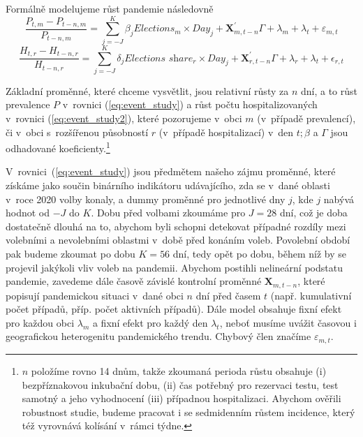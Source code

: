 Formálně modelujeme růst pandemie následovně
\begin{equation}
\label{eq:event_study}
\frac{P_{t,m} - P_{t-n,m}}{P_{t-n,m}} = \sum_{j=-J}^{K} \beta_j \textit{Elections}_m \times Day_j + \textbf{X}_{m,t-n}^{'}\Gamma + \lambda_{m} + \lambda_{t} + \varepsilon_{m,t}
\end{equation}
\begin{equation}
\label{eq:event_study2}
\frac{H_{t,r} - H_{t-n,r}}{H_{t-n,r}} = \sum_{j=-J}^{K} \delta_j \textit{Elections share}_r \times Day_j + \textbf{X}_{r,t-n}^{'}\Gamma + \lambda_{r} + \lambda_{t} + \epsilon_{r,t}
\end{equation}

Základní proměnné, které chceme vysvětlit, jsou relativní růsty za $n$ dní, a to růst prevalence $P$ v~rovnici (\ref{eq:event_study}) a růst počtu hospitalizovaných v~rovnici (\ref{eq:event_study2}), které pozorujeme v~obci $m$ (v~případě prevalencí), či v~obci s~rozšířenou působností $r$ (v~případě hospitalizací) v~den $t; \beta$ a $\Gamma$ jsou odhadované koeficienty.\footnote{$n$ položíme rovno 14 dnům, takže zkoumaná perioda růstu obsahuje
(i) bezpříznakovou inkubační dobu\cite{lauer_et_al2020}, (ii) čas potřebný pro rezervaci testu, test samotný a jeho vyhodnocení (iii) případnou hospitalizaci. Abychom ověřili robustnost studie, budeme pracovat i se sedmidenním růstem incidence, který též vyrovnává kolísání v~rámci týdne.}


V~rovnici~(\ref{eq:event_study}) jsou předmětem našeho zájmu proměnné, které získáme jako součin binárního indikátoru udávajícího, zda se v~dané oblasti v~roce 2020 volby konaly, a dummy proměnné pro jednotlivé dny $j$, kde $j$ nabývá hodnot od $-J$ do $K$. 
Dobu před volbami zkoumáme pro $J=28$ dní, což je doba dostatečně dlouhá na to, abychom byli schopni detekovat případné rozdíly mezi volebními a nevolebními oblastmi v~době před konáním voleb. Povolební období pak budeme zkoumat po dobu $K=56$ dní, tedy opět po dobu, během níž by se projevil jakýkoli vliv voleb na pandemii. Abychom postihli nelineární podstatu pandemie, zavedeme dále časově závislé kontrolní proměnné $\textbf{X}_{m,t-n}$, které popisují pandemickou situaci v~dané obci $n$ dní před časem $t$ (např. kumulativní počet případů, příp. počet aktivních případů). Dále model obsahuje fixní efekt pro každou obci $\lambda_{m}$ a fixní efekt pro každý den $\lambda_{t}$, neboť musíme uvážit časovou i geografickou heterogenitu pandemického trendu. Chybový člen značíme
 $\varepsilon_{m,t}$.

